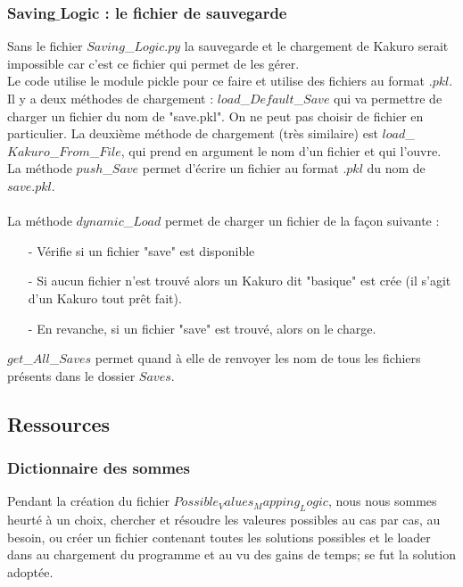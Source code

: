 \documentclass[french,12pt]{article}
\begin{document}
\subsubsection{Saving$\_$Logic : le fichier de sauvegarde}
Sans le fichier $Saving$\_$Logic.py$ la sauvegarde et le chargement de Kakuro serait impossible car c'est ce fichier qui permet de les gérer. \\
Le code utilise le module pickle pour ce faire et utilise des fichiers au format $.pkl$.  \\
Il y a deux méthodes de chargement : $load$\_$Default$\_$Save$ qui va permettre de charger un fichier du nom de "save.pkl". On ne peut pas choisir de fichier en particulier. La deuxième méthode de chargement (très similaire) est $load$\_$Kakuro$\_$From$\_$File$, qui prend en argument le nom d'un fichier et qui l'ouvre. \\
La méthode $push$\_$Save$ permet d'écrire un fichier au format $.pkl$ du nom de $save.pkl$. \\ \\
La méthode $dynamic$\_$Load$ permet de charger un fichier de la façon suivante : \\
\begin{enumerate}
\item[-] Vérifie si un fichier "save" est disponible\\
\item[-] Si aucun fichier n'est trouvé alors un Kakuro dit "basique" est crée (il s'agit d'un Kakuro tout prêt fait). \\
\item[-] En revanche, si un fichier "save" est trouvé, alors on le charge.\\
\end{enumerate}

$get$\_$All$\_$Saves$ permet quand à elle de renvoyer les nom de tous les fichiers présents dans le dossier $Saves$.
\subsection{Ressources}
\subsubsection{Dictionnaire des sommes}

Pendant la création du fichier $Possible_Values_Mapping_Logic$, nous nous sommes heurté à un choix, chercher et résoudre les valeures possibles au cas par cas, au besoin, ou créer un fichier contenant toutes les solutions possibles et le loader dans au chargement du programme et au vu des gains de temps; se fut la solution adoptée.\\
\end{document}

